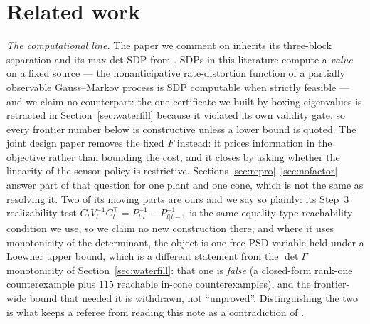 \section{Related work}
\label{sec:related}

\emph{The computational line.} The paper we comment on \cite{refpaper} inherits
its three-block separation and its max-det SDP from \cite{tanaka2018di}. SDPs in
this literature compute a \emph{value} on a fixed source --- the nonanticipative
rate-distortion function of a partially observable Gauss--Markov process is SDP
computable when strictly feasible \cite{stavrou2019indirect} --- and we claim no
counterpart: the one certificate we built by boxing eigenvalues is retracted in
Section~\ref{sec:waterfill} because it violated its own validity gate, so every
frontier number below is constructive unless a lower bound is quoted. The joint
design paper \cite{tanaka2015joint} removes the fixed $F$ instead: it prices
information in the objective rather than bounding the cost, and it closes by
asking whether the linearity of the sensor policy is restrictive. Sections
\ref{sec:repro}--\ref{sec:nofactor} answer part of that question for one plant and
one cone, which is not the same as resolving it. Two of its moving parts are ours
and we say so plainly: its Step~3 realizability test
$C_tV_t^{-1}C_t^{\top}=P_{t|t}^{-1}-P_{t|t-1}^{-1}$ is the same equality-type
reachability condition we use, so we claim no new construction there; and where it
uses monotonicity of the determinant, the object is one free PSD variable held
under a Loewner upper bound, which is a different statement from the
$\det\Gamma$ monotonicity of Section~\ref{sec:waterfill}: that one is
\emph{false} (a closed-form rank-one counterexample plus $115$ reachable in-cone
counterexamples), and the frontier-wide bound that needed it is withdrawn, not
``unproved''. Distinguishing the two is what keeps a referee from reading this
note as a contradiction of \cite{tanaka2018di}.

